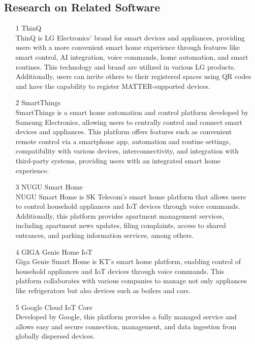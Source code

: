 \documentclass[conference]{IEEEtran}
\begin{document}
\subsection{Research on Related Software}
\begin{itemize}
\item [1]ThinQ\\
ThinQ is LG Electronics' brand for smart devices and appliances, providing users with a more convenient smart home experience through features like smart control, AI integration, voice commands, home automation, and smart routines. This technology and brand are utilized in various LG products. Additionally, users can invite others to their registered spaces using QR codes and have the capability to register MATTER-supported devices. \\
\item [2]SmartThings\\
 SmartThings is a smart home automation and control platform developed by Samsung Electronics, allowing users to centrally control and connect smart devices and appliances. This platform offers features such as convenient remote control via a smartphone app, automation and routine settings, compatibility with various devices, interconnectivity, and integration with third-party systems, providing users with an integrated smart home experience.\\
\item [3]NUGU Smart Home\\
 NUGU Smart Home is SK Telecom's smart home platform that allows users to control household appliances and IoT devices through voice commands. Additionally, this platform provides apartment management services, including apartment news updates, filing complaints, access to shared entrances, and parking information services, among others.
\\
\item [4]GIGA Genie Home IoT\\
Giga Genie Smart Home is KT's smart home platform, enabling control of household appliances and IoT devices through voice commands. This platform collaborates with various companies to manage not only appliances like refrigerators but also devices such as boilers and cars.
\\
\item [5]Google Cloud IoT Core\\
Developed by Google, this platform provides a fully managed service and allows easy and secure connection, management, and data ingestion from globally dispersed devices.

\end{itemize}
\end{document}
